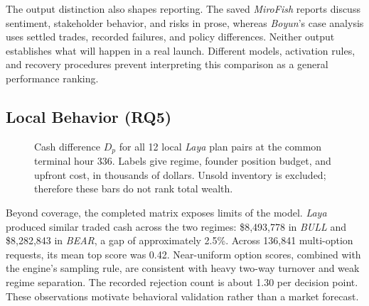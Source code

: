 The output distinction also shapes reporting. The saved \textit{MiroFish}
reports discuss sentiment, stakeholder behavior, and risks in prose, whereas
\textit{Boyun}'s case analysis uses settled trades, recorded failures, and
policy differences. Neither output establishes what will happen in a real
launch. Different models, activation rules, and recovery procedures prevent
interpreting this comparison as a general performance ranking.

\subsection{Local  Behavior (RQ5)}\label{sec:res-laya}
\begin{figure}[t]
\centering
{}
\caption{Cash difference $D_p$ for all 12 local \textit{Laya} plan pairs
at the common terminal hour 336. Labels give regime, founder position budget,
and upfront cost, in thousands of dollars. Unsold inventory is excluded;
therefore these bars do not rank total wealth.}
\label{fig:matched-laya}
\end{figure}

Beyond coverage, the completed matrix exposes limits of the  model.
\textit{Laya} produced similar traded cash across the two regimes:
\$8{,}493{,}778 in \textit{BULL} and \$8{,}282{,}843 in \textit{BEAR}, a gap
of approximately 2.5\%. Across 136{,}841 multi-option requests, its mean top
score was 0.42. Near-uniform option scores, combined with the engine's sampling
rule, are consistent with heavy two-way turnover and weak regime separation.
The recorded rejection count is about 1.30 per decision point. These
observations motivate behavioral validation rather than a market forecast.

